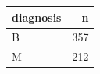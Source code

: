 \begin{tabular}{lr}
\toprule
diagnosis & n \\
\midrule
B & 357 \\
M & 212 \\
\bottomrule
\end{tabular}
